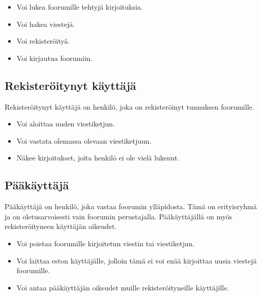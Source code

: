 \documentclass[a4paper, 12pt, finnish]{article}
\begin{document}
\begin{itemize}
\item
Voi lukea foorumille tehtyjä kirjoituksia.

\item
Voi hakea viestejä.

\item
Voi rekisteröityä.

\item
Voi kirjautua foorumiin.
\end{itemize}

\subsection{Rekisteröitynyt käyttäjä}
Rekisteröitynyt käyttäjä on henkilö, joka on rekisteröinyt tunnuksen foorumille.

\begin{itemize}
\item
    Voi aloittaa uuden viestiketjun.
\item
    Voi vastata olemassa olevaan viestiketjuun.
\item
    Näkee kirjoitukset, joita henkilö ei ole vielä lukenut.
\end{itemize}

\subsection{Pääkäyttäjä}
Pääkäyttäjä on henkilö, joka vastaa foorumin ylläpidosta.
Tämä on erityisryhmä ja on oletusarvoisesti vain foorumin perustajalla. Pääkäyttäjällä on myös rekisteröityneen käyttäjän oikeudet.

\begin{itemize}
\item
Voi poistaa foorumille kirjoitetun viestin tai viestiketjun.
\item
Voi laittaa eston käyttäjälle, jolloin tämä ei voi enää kirjoittaa uusia viestejä foorumille.
\item
Voi antaa pääkäyttäjän oikeudet muille rekisteröityneille käyttäjille.
\end{itemize}
\end{document}
